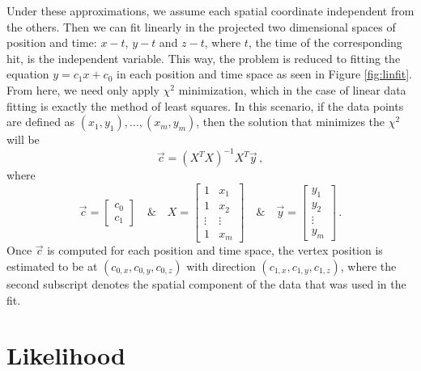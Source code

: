 Under these approximations, we assume each spatial coordinate independent from the others. Then we can fit linearly in the projected two dimensional spaces of position and time: $x-t$, $y-t$ and $z-t$, where $t$, the time of the corresponding hit, is the independent variable. This way, the problem is reduced to fitting the equation $y=c_{1}x + c_{0}$ in each position and time space as seen in Figure \ref{fig:linfit}. From here, we need only apply $\chi^{2}$ minimization, which in the case of linear data fitting is exactly the method of least squares. In this scenario, if the data points are defined as $(x_{1},y_{1}), \dots, (x_{m},y_{m})$, then the solution that minimizes the $\chi^{2}$ will be
\begin{equation}
  \vec{c} = (X^{T}X)^{-1}X^{T}\vec{y}\, ,
\end{equation}
where
\begin{equation}
  \vec{c} =
  \begin{bmatrix}
    c_{0} \\
    c_{1}
  \end{bmatrix}
  \quad \& \quad
  X =
  \begin{bmatrix}
    1 & x_{1} \\
    1 & x_{2} \\
    \vdots & \vdots \\
    1 & x_{m}
  \end{bmatrix}
  \quad \& \quad
  \vec{y} = 
  \begin{bmatrix}
    y_{1} \\
    y_{2} \\
    \vdots \\
    y_{m}
  \end{bmatrix}\, .
\end{equation}
Once $\vec{c}$ is computed for each position and time space, the vertex position is estimated to be at $(c_{0,x}, c_{0,y}, c_{0,z})$ with direction $(c_{1,x}, c_{1,y}, c_{1,z})$, where the second subscript denotes the spatial component of the data that was used in the fit. 

\section{Likelihood}

